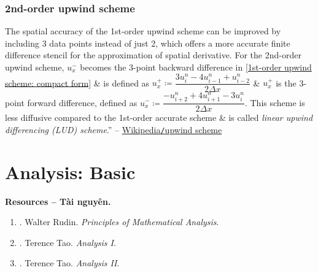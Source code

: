\documentclass{article}
\begin{document}
\subsubsection{2nd-order upwind scheme}
The spatial accuracy of the 1st-order upwind scheme can be improved by including 3 data points instead of just 2, which offers a more accurate finite difference stencil for the approximation of spatial derivative. For the 2nd-order upwind scheme, $u_x^-$ becomes the 3-point backward difference in \eqref{1st-order upwind scheme: compact form} \& is defined as $u_x^+\coloneqq\dfrac{3u_i^n - 4u_{i-1}^n + u_{i-2}^n}{2\Delta x}$ \& $u_x^+$ is the 3-point forward difference, defined as $u_x^-\coloneqq\dfrac{-u_{i+2}^n + 4u_{i+1}^n - 3u_i^n}{2\Delta x}$. This scheme is less diffusive compared to the 1st-order accurate scheme \& is called {\it linear upwind differencing (LUD) scheme}.'' -- \href{https://en.wikipedia.org/wiki/Upwind_scheme}{Wikipedia{\tt/}upwind scheme}


\section{Analysis: Basic}
\textbf{\textsf{Resources -- Tài nguyên.}}
\begin{enumerate}
	\item \cite{Rudin1976}. {\sc Walter Rudin}. {\it Principles of Mathematical Analysis}.
	
	\item \cite{Tao_analysis_1}. {\sc Terence Tao}. {\it Analysis I}.
	
	\item \cite{Tao_analysis_2}. {\sc Terence Tao}. {\it Analysis II}.
\end{enumerate}

\end{document}
